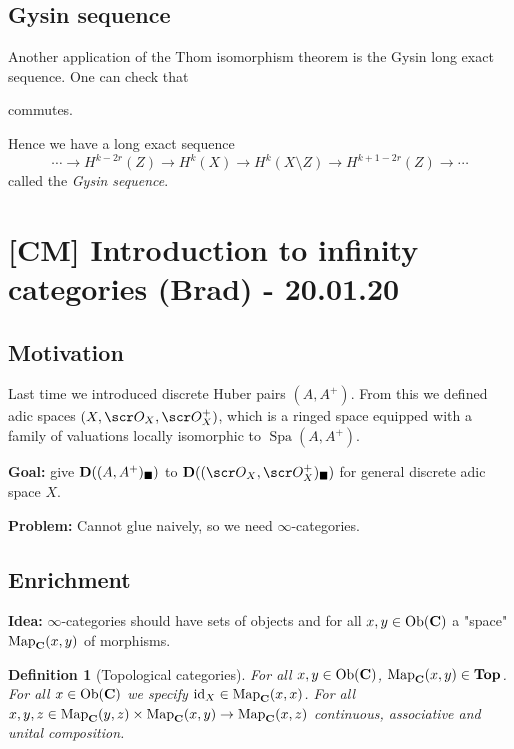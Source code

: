 \documentclass[A4paper, british, reqno]{amsart}
\theoremstyle{darkgreentheorem}
\theoremstyle{darkbluedefinition}
\newtheorem{defn}[thm]{Definition}
\theoremstyle{darkredexample}
\theoremstyle{remark}
\DeclareMathOperator{\Ob}{Ob}
\DeclareMathOperator{\Map}{Map}
\newcommand{\1}{\mathbbm{1}}
\newcommand{\id}{\mathrm{id}}
\begin{document}
\subsection{Gysin sequence}

Another application of the Thom isomorphism theorem is the Gysin long exact sequence.
One can check that
\begin{center}
\end{center}
commutes.

Hence we have a long exact sequence
\[\cdots \to H^{k-2r}(Z)\to H^{k}(X)\to H^{k}(X\setminus Z)\to H^{k+1-2r}(Z)\to \cdots \]
called the \textit{Gysin sequence}.

\section{[CM] Introduction to infinity categories (Brad) - 20.01.20}

\subsection{Motivation}

Last time we introduced discrete Huber pairs $(A,A^{+})$.
From this we defined adic spaces $(X,\O_{X},\O_{X}^{+})$, which is a ringed space equipped with a family of valuations locally isomorphic to $\operatorname{Spa}(A,A^{+})$.

\textbf{Goal:}
give $\mathbf{D}((A,A^{+})_{\blacksquare})$ to $\D((\O_{X},\O_{X}^{+})_{\blacksquare})$ for general discrete adic space $X$.

\textbf{Problem:}
Cannot glue naively, so we need $\infty$-categories.

\subsection{Enrichment}

\textbf{Idea:}
$\infty$-categories should have sets of objects and for all $x,y\in \Ob(\bfC)$ a "space" $\Map_{\bfC}(x,y)$ of morphisms.

\begin{defn}[Topological categories]
    For all $x,y\in \Ob(\bfC)$, $\Map_{\bfC}(x,y)\in \Top$.
    For all $x\in \Ob(\bfC)$ we specify $\id_{X}\in \Map_{\bfC}(x,x)$.
    For all $x,y,z\in \Map_{\bfC}(y,z)\times \Map_{\bfC}(x,y)\to \Map_{\bfC}(x,z)$ continuous, associative and unital composition.
\end{defn}
\end{document}

